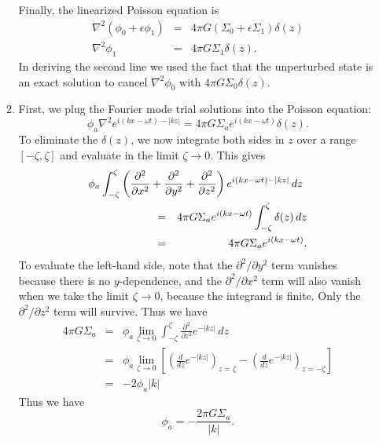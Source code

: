 \begin{enumerate}
\begin{enumerate}
Finally, the linearized Poisson equation is
\begin{eqnarray*}
\nabla^2 (\phi_0 + \epsilon \phi_1) & = & 4\pi G (\Sigma_0 + \epsilon \Sigma_1) \delta(z) \\
\nabla^2 \phi_1 & = & 4\pi G \Sigma_1 \delta(z).
\end{eqnarray*}
In deriving the second line we used the fact that the unperturbed state is an exact solution to cancel $\nabla^2 \phi_0$ with $4\pi G \Sigma_0\delta(z)$.

\item First, we plug the Fourier mode trial solutions into the Poisson equation:
\begin{displaymath}
 \phi_a \nabla^2 e^{i(kx-\omega t)-|kz|} = 4\pi G \Sigma_a e^{i(kx-\omega t)} \delta(z).
\end{displaymath}
To eliminate the $\delta(z)$, we now integrate both sides in $z$ over a range $[-\zeta,\zeta]$ and evaluate in the limit $\zeta \rightarrow 0$. This gives
\begin{eqnarray*}
\lefteqn{\phi_a \int_{-\zeta}^\zeta \left(\frac{\partial^2}{\partial x^2} + \frac{\partial^2}{\partial y^2} + \frac{\partial^2}{\partial z^2}\right) e^{i(kx-\omega t)-|kz|} \, dz} \qquad\qquad\qquad
\nonumber \\
& = &  4 \pi G \Sigma_a  e^{i(kx-\omega t)} \int_{-\zeta}^\zeta \delta(z) \, dz \\
& = & 4\pi G \Sigma_a e^{i(kx-\omega t)}.
\end{eqnarray*}
To evaluate the left-hand side, note that the $\partial^2/\partial y^2$ term vanishes because there is no $y$-dependence, and the $\partial^2/\partial x^2$ term will also vanish when we take the limit $\zeta\rightarrow 0$, because the integrand is finite. Only the $\partial^2/\partial z^2$ term will survive. Thus we have
\begin{eqnarray*}
4\pi G \Sigma_a & = & \phi_a \lim_{\zeta\rightarrow 0} \int_{-\zeta}^\zeta \frac{\partial^2}{\partial z^2} e^{-|kz|} \, dz \\
& = & \phi_a \lim_{\zeta\rightarrow 0} \left[\left(\frac{d}{dz} e^{-|kz|}\right)_{z=\zeta} - \left(\frac{d}{dz} e^{-|kz|}\right)_{z=-\zeta}\right] \\
& = & -2\phi_a |k|
\end{eqnarray*}
Thus we have
\begin{displaymath}
\phi_a = -\frac{2\pi G\Sigma_a}{|k|}.
\end{displaymath}


\end{enumerate}
\end{enumerate}
